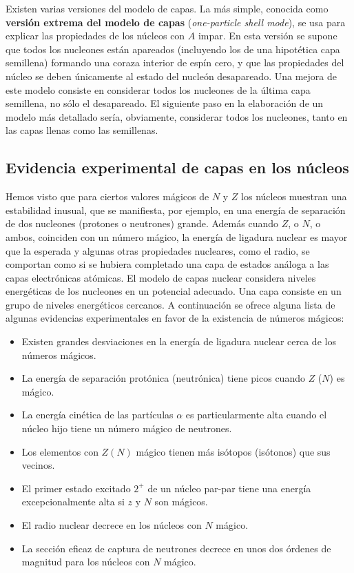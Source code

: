 Existen varias versiones del modelo de capas. La más simple, conocida como \textbf{versión extrema del modelo de capas} (\textit{one-particle shell mode}), se usa para explicar las propiedades de los núcleos con $A$ impar. En esta versión se supone que todos los nucleones están apareados (incluyendo los de una hipotética capa semillena) formando una coraza interior de espín cero, y que las propiedades del núcleo se deben únicamente al estado del nucleón desapareado. Una mejora de este modelo consiste en considerar todos los nucleones de la última capa semillena, no sólo el desapareado. El siguiente paso en la elaboración de un modelo más detallado sería, obviamente, considerar todos los nucleones, tanto en las capas llenas como las semillenas.

\subsection{Evidencia experimental de capas en los núcleos}

Hemos visto que para ciertos valores mágicos de $N$ y $Z$ los núcleos muestran una estabilidad inusual, que se manifiesta, por ejemplo, en una energía de separación de dos nucleones (protones o neutrones) grande. Además cuando $Z$, o $N$, o ambos, coinciden con un número mágico, la energía de ligadura nuclear es mayor que la esperada y algunas otras propiedades nucleares, como el radio, se comportan como si se hubiera completado una capa de estados análoga a las capas electrónicas atómicas. El modelo de capas nuclear considera niveles energéticas de los nucleones en un potencial adecuado. Una capa consiste en un grupo de niveles energéticos cercanos. A continuación se ofrece alguna lista de algunas evidencias experimentales en favor de la existencia de números mágicos:

\begin{itemize}
	\item Existen grandes desviaciones en la energía de ligadura nuclear cerca de los números mágicos. 
	\item La energía de separación protónica (neutrónica) tiene picos cuando $Z$ ($N$) es mágico.
	\item La energía cinética de las partículas $\alpha$ es particularmente alta cuando el núcleo hijo tiene un número mágico de neutrones.
	\item Los elementos con $Z(N)$ mágico tienen más isótopos (isótonos) que sus vecinos.
	\item El primer estado excitado $2^+$ de un núcleo par-par tiene una energía excepcionalmente alta si $z$ y $N$ son mágicos.
	\item El radio nuclear decrece en los núcleos con $N$ mágico.
	\item La sección eficaz de captura de neutrones decrece en unos dos órdenes de magnitud para los núcleos con $N$ mágico.
\end{itemize}


